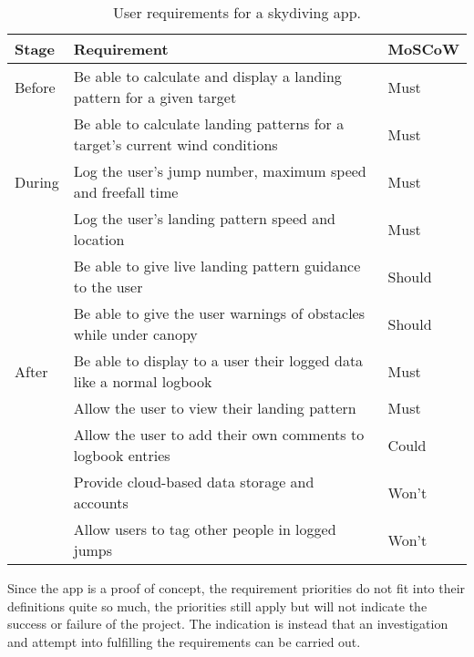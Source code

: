 \begin{table*}[ht]
  \centering
  \caption{User requirements for a skydiving app.}\label{tab:user-requirements}
  \begin{tabular}{@{}lll@{}}
    \toprule
    \textbf{Stage}  & \textbf{Requirement} & \textbf{MoSCoW} \\
    \midrule
    Before & Be able to calculate and display a landing pattern for a given target & Must \\
           & Be able to calculate landing patterns for a target's current wind conditions & Must \vspace{2mm} \\
    During & Log the user's jump number, maximum speed and freefall time & Must \\
           & Log the user's landing pattern speed and location & Must \\
           & Be able to give live landing pattern guidance to the user & Should \\
           & Be able to give the user warnings of obstacles while under canopy & Should \vspace{2mm} \\
    After  & Be able to display to a user their logged data like a normal logbook & Must \\
           & Allow the user to view their landing pattern & Must \\
           & Allow the user to add their own comments to logbook entries & Could \\
           & Provide cloud-based data storage and accounts & Won't \\
           & Allow users to tag other people in logged jumps & Won't \\
    \bottomrule
  \end{tabular}
\end{table*}

Since the app is a proof of concept, the requirement priorities do not fit into their definitions quite so much, the priorities still apply but will not indicate the success or failure of the project. The indication is instead that an investigation and attempt into fulfilling the requirements can be carried out.

